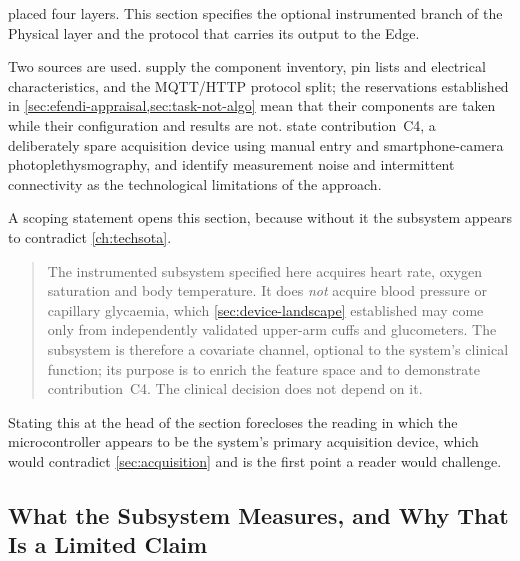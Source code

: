 \documentclass[12pt,a4paper,oneside]{report}
\begin{document}
 placed four layers. This section specifies the optional instrumented branch of the Physical layer and the protocol that carries its output to the Edge.

Two sources are used. \Textcite{efendi2025} supply the component inventory, pin lists and electrical characteristics, and the MQTT/HTTP protocol split; the reservations established in \cref{sec:efendi-appraisal,sec:task-not-algo} mean that their components are taken while their configuration and results are not. \Textcite{cadrage2026} state contribution~C4, a deliberately spare acquisition device using manual entry and smartphone-camera photoplethysmography, and identify measurement noise and intermittent connectivity as the technological limitations of the approach.

A scoping statement opens this section, because without it the subsystem appears to contradict \cref{ch:techsota}.

\begin{quote}
The instrumented subsystem specified here acquires heart rate, oxygen saturation and body temperature. It does \emph{not} acquire blood pressure or capillary glycaemia, which \cref{sec:device-landscape} established may come only from independently validated upper-arm cuffs and glucometers. The subsystem is therefore a covariate channel, optional to the system's clinical function; its purpose is to enrich the feature space and to demonstrate contribution~C4. The clinical decision does not depend on it.
\end{quote}

Stating this at the head of the section forecloses the reading in which the microcontroller appears to be the system's primary acquisition device, which would contradict \cref{sec:acquisition} and is the first point a reader would challenge.

\subsection{What the Subsystem Measures, and Why That Is a Limited Claim}\label{sec:measures}
\end{document}
